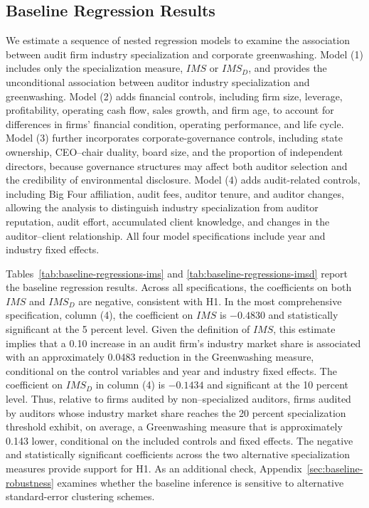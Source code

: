 \documentclass[11pt]{article}
\begin{document}
\subsection{Baseline Regression Results}

We estimate a sequence of nested regression models to examine the association between audit firm industry specialization and corporate greenwashing. 
Model (1) includes only the specialization measure, \(IMS\) or \(IMS_D\), and provides the unconditional association between auditor industry specialization and greenwashing. 
Model (2) adds financial controls, including firm size, leverage, profitability, operating cash flow, sales growth, and firm age, to account for differences in firms’ financial condition, operating performance, and life cycle. 
Model (3) further incorporates corporate-governance controls, including state ownership, CEO–chair duality, board size, and the proportion of independent directors, because governance structures may affect both auditor selection and the credibility of environmental disclosure. 
Model (4) adds audit-related controls, including Big Four affiliation, audit fees, auditor tenure, and auditor changes, allowing the analysis to distinguish industry specialization from auditor reputation, audit effort, accumulated client knowledge, and changes in the auditor–client relationship.
All four model specifications include year and industry fixed effects.

Tables~\ref{tab:baseline-regressions-ims} and \ref{tab:baseline-regressions-imsd} report the baseline regression results. 
Across all specifications, the coefficients on both \(IMS\) and \(IMS_D\) are negative, consistent with H1. 
In the most comprehensive specification, column (4), the coefficient on \(IMS\) is \(-0.4830\) and statistically significant at the 5 percent level. 
Given the definition of \(IMS\), this estimate implies that a 0.10 increase in an audit firm’s industry market share is associated with an approximately 0.0483 reduction in the Greenwashing measure, 
conditional on the control variables and year and industry fixed effects. 
The coefficient on \(IMS_D\) in column (4) is \(-0.1434\) and significant at the 10 percent level. 
Thus, relative to firms audited by non--specialized auditors, firms audited by auditors whose industry market share reaches the 20 percent specialization threshold exhibit, on average, a Greenwashing measure that is approximately 0.143 lower, conditional on the included controls and fixed effects. 
The negative and statistically significant coefficients across the two alternative specialization measures provide support for H1. As an additional check, Appendix~\ref{sec:baseline-robustness} examines whether the baseline inference is sensitive to alternative standard-error clustering schemes.
\end{document}
